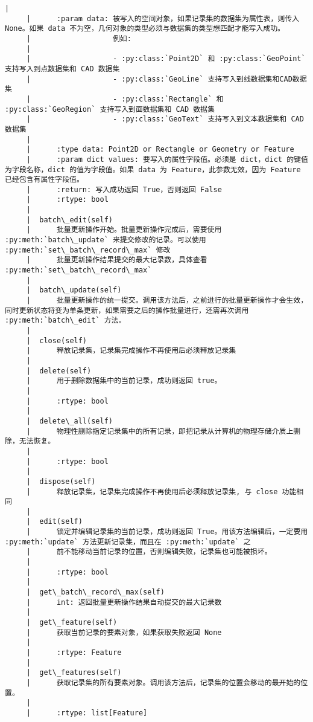 \documentclass[11pt]{article}
\begin{document}
\begin{Verbatim}[commandchars=\\\{\}]
     |      
     |      :param data: 被写入的空间对象，如果记录集的数据集为属性表，则传入 None。如果 data 不为空，几何对象的类型必须与数据集的类型想匹配才能写入成功。
     |                   例如:
     |      
     |                   - :py:class:`Point2D` 和 :py:class:`GeoPoint` 支持写入到点数据集和 CAD 数据集
     |                   - :py:class:`GeoLine` 支持写入到线数据集和CAD数据集
     |                   - :py:class:`Rectangle` 和 :py:class:`GeoRegion` 支持写入到面数据集和 CAD 数据集
     |                   - :py:class:`GeoText` 支持写入到文本数据集和 CAD 数据集
     |      
     |      :type data: Point2D or Rectangle or Geometry or Feature
     |      :param dict values: 要写入的属性字段值。必须是 dict，dict 的键值为字段名称，dict 的值为字段值。如果 data 为 Feature，此参数无效，因为 Feature 已经包含有属性字段值。
     |      :return: 写入成功返回 True，否则返回 False
     |      :rtype: bool
     |  
     |  batch\_edit(self)
     |      批量更新操作开始。批量更新操作完成后，需要使用 :py:meth:`batch\_update` 来提交修改的记录。可以使用 :py:meth:`set\_batch\_record\_max` 修改
     |      批量更新操作结果提交的最大记录数，具体查看 :py:meth:`set\_batch\_record\_max`
     |  
     |  batch\_update(self)
     |      批量更新操作的统一提交。调用该方法后，之前进行的批量更新操作才会生效，同时更新状态将变为单条更新，如果需要之后的操作批量进行，还需再次调用 :py:meth:`batch\_edit` 方法。
     |  
     |  close(self)
     |      释放记录集，记录集完成操作不再使用后必须释放记录集
     |  
     |  delete(self)
     |      用于删除数据集中的当前记录，成功则返回 true。
     |      
     |      :rtype: bool
     |  
     |  delete\_all(self)
     |      物理性删除指定记录集中的所有记录，即把记录从计算机的物理存储介质上删除，无法恢复。
     |      
     |      :rtype: bool
     |  
     |  dispose(self)
     |      释放记录集，记录集完成操作不再使用后必须释放记录集, 与 close 功能相同
     |  
     |  edit(self)
     |      锁定并编辑记录集的当前记录，成功则返回 True。用该方法编辑后，一定要用 :py:meth:`update` 方法更新记录集，而且在 :py:meth:`update` 之
     |      前不能移动当前记录的位置，否则编辑失败，记录集也可能被损坏。
     |      
     |      :rtype: bool
     |  
     |  get\_batch\_record\_max(self)
     |      int: 返回批量更新操作结果自动提交的最大记录数
     |  
     |  get\_feature(self)
     |      获取当前记录的要素对象，如果获取失败返回 None
     |      
     |      :rtype: Feature
     |  
     |  get\_features(self)
     |      获取记录集的所有要素对象。调用该方法后，记录集的位置会移动的最开始的位置。
     |      
     |      :rtype: list[Feature]

\end{Verbatim}
\end{document}
